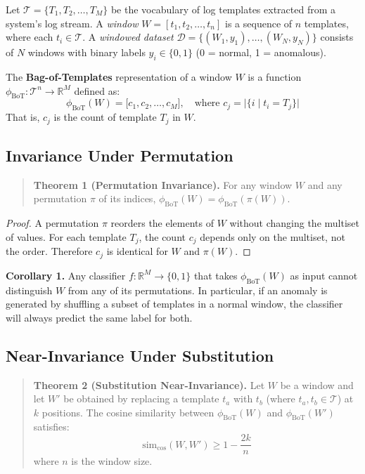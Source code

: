 \documentclass[11pt]{article}
\begin{document}
Let $\mathcal{T} = \{T_1, T_2, \dots, T_M\}$ be the vocabulary of log templates extracted from a system's log stream.
A \emph{window} $W = [t_1, t_2, \dots, t_n]$ is a sequence of $n$ templates, where each $t_i \in \mathcal{T}$.
A \emph{windowed dataset} $\mathcal{D} = \{(W_1, y_1), \dots, (W_N, y_N)\}$ consists of $N$ windows with binary labels $y_i \in \{0, 1\}$ (0 = normal, 1 = anomalous).

The \textbf{Bag-of-Templates} representation of a window $W$ is a function $\phi_{\text{BoT}}: \mathcal{T}^n \rightarrow \mathbb{R}^M$ defined as:
\begin{equation}
    \phi_{\text{BoT}}(W) = \big[c_1, c_2, \dots, c_M\big], \quad \text{where } c_j = \big|\{i \mid t_i = T_j\}\big|
    \label{eq:bot}
\end{equation}
That is, $c_j$ is the count of template $T_j$ in $W$.

\subsection{Invariance Under Permutation}

\begin{quote}
\textbf{Theorem 1 (Permutation Invariance).} 
For any window $W$ and any permutation $\pi$ of its indices, $\phi_{\text{BoT}}(W) = \phi_{\text{BoT}}(\pi(W))$.
\end{quote}

\begin{proof}
A permutation $\pi$ reorders the elements of $W$ without changing the multiset of values. 
For each template $T_j$, the count $c_j$ depends only on the multiset, not the order. 
Therefore $c_j$ is identical for $W$ and $\pi(W)$.
\end{proof}

\textbf{Corollary 1.} Any classifier $f: \mathbb{R}^M \rightarrow \{0, 1\}$ that takes $\phi_{\text{BoT}}(W)$ as input cannot distinguish $W$ from any of its permutations. In particular, if an anomaly is generated by shuffling a subset of templates in a normal window, the classifier will always predict the same label for both.

\subsection{Near-Invariance Under Substitution}

\begin{quote}
\textbf{Theorem 2 (Substitution Near-Invariance).}
Let $W$ be a window and let $W'$ be obtained by replacing a template $t_a$ with $t_b$ (where $t_a, t_b \in \mathcal{T}$) at $k$ positions.
The cosine similarity between $\phi_{\text{BoT}}(W)$ and $\phi_{\text{BoT}}(W')$ satisfies:
\begin{equation}
    \text{sim}_{\text{cos}}(W, W') \geq 1 - \frac{2k}{n}
    \label{eq:cosine}
\end{equation}
where $n$ is the window size.
\end{quote}
\end{document}
